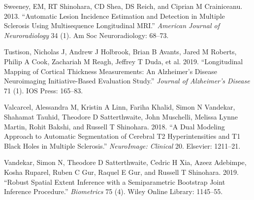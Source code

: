\documentclass[]{elsarticle} %
\begin{document}
\hypertarget{ref-sweeney2013automatic}{}
Sweeney, EM, RT Shinohara, CD Shea, DS Reich, and Ciprian M Crainiceanu.
2013. ``Automatic Lesion Incidence Estimation and Detection in Multiple
Sclerosis Using Multisequence Longitudinal MRI.'' \emph{American Journal
of Neuroradiology} 34 (1). Am Soc Neuroradiology: 68--73.

\hypertarget{ref-tustison2019longitudinal}{}
Tustison, Nicholas J, Andrew J Holbrook, Brian B Avants, Jared M
Roberts, Philip A Cook, Zachariah M Reagh, Jeffrey T Duda, et al. 2019.
``Longitudinal Mapping of Cortical Thickness Measurements: An
Alzheimer's Disease Neuroimaging Initiative-Based Evaluation Study.''
\emph{Journal of Alzheimer's Disease} 71 (1). IOS Press: 165--83.

\hypertarget{ref-valcarcel2018dual}{}
Valcarcel, Alessandra M, Kristin A Linn, Fariha Khalid, Simon N
Vandekar, Shahamat Tauhid, Theodore D Satterthwaite, John Muschelli,
Melissa Lynne Martin, Rohit Bakshi, and Russell T Shinohara. 2018. ``A
Dual Modeling Approach to Automatic Segmentation of Cerebral T2
Hyperintensities and T1 Black Holes in Multiple Sclerosis.''
\emph{NeuroImage: Clinical} 20. Elsevier: 1211--21.

\hypertarget{ref-vandekar2019robust}{}
Vandekar, Simon N, Theodore D Satterthwaite, Cedric H Xia, Azeez
Adebimpe, Kosha Ruparel, Ruben C Gur, Raquel E Gur, and Russell T
Shinohara. 2019. ``Robust Spatial Extent Inference with a Semiparametric
Bootstrap Joint Inference Procedure.'' \emph{Biometrics} 75 (4). Wiley
Online Library: 1145--55.
\end{document}
